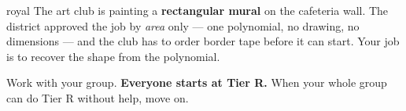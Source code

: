 \documentclass[10pt]{article}
\begin{document}

\vspace{0.15in}

\begin{scenariobox}{royal}
\small
The art club is painting a \textbf{rectangular mural} on the cafeteria wall. The district approved
the job by \emph{area} only --- one polynomial, no drawing, no dimensions --- and the club has to
order border tape before it can start. Your job is to recover the shape from the polynomial.

Work with your group. \textbf{Everyone starts at Tier R.} When your whole group can do Tier R
without help, move on.
\end{scenariobox}

\vspace{0.10in}
\end{document}
